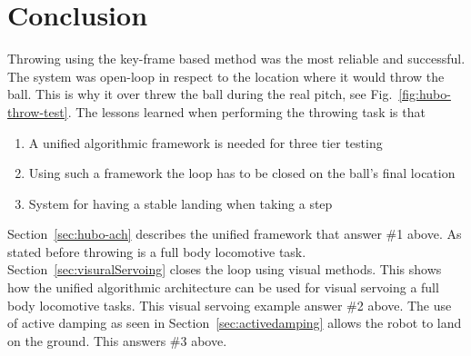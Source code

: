 \section{Conclusion}\label{sec:throw:conclusion}
	Throwing using the key-frame based method was the most reliable and successful.  
	The system was open-loop in respect to the location where it would throw the ball.
	This is why it over threw the ball during the real pitch, see Fig.~\ref{fig:hubo-throw-test}.
	The lessons learned when performing the throwing task is that
	\begin{enumerate}
		\item A unified algorithmic framework is needed for three tier testing
		\item Using such a framework the loop has to be closed on the ball's final location
		\item System for having a stable landing when taking a step
	\end{enumerate}

	Section~\ref{sec:hubo-ach} describes the unified framework that answer \#1 above.
	As stated before throwing is a full body locomotive task. 
	Section~\ref{sec:visuralServoing} closes the loop using visual methods.
	This shows how the unified algorithmic architecture can be used for visual servoing a full body locomotive tasks.
	This visual servoing example answer \#2 above.
	The use of active damping as seen in Section~\ref{sec:activedamping} allows the robot to land on the ground.
	This answers \#3 above.



		
